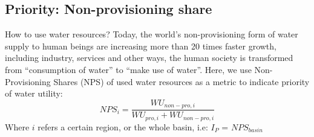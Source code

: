 \documentclass[9pt,twoside,lineno]{pnas-new}
\begin{document}
\subsection*{Priority: Non-provisioning share}
    How to use water resources?
    Today, the world's non-provisioning form of water supply to human beings are increasing more than 20 times faster growth, including industry, services and other ways, the human society is transformed from ``consumption of water'' to ``make use of water''.
    Here, we use Non-Provisioning Shares (NPS) of used water resources as a metric to indicate priority of water utility:
    $$ NPS_{i} = \frac{WU_{non-pro, i}}{WU_{pro, i} + WU_{non-pro, i}} $$
    Where $i$ refers a certain region, or the whole basin, i.e:
	$I_P$ = $NPS_{basin}$
\end{document}
